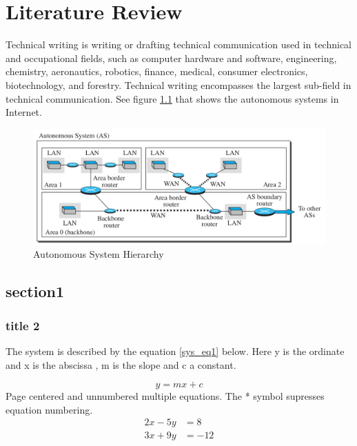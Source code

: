 \chapter{Literature Review}
Technical writing is writing or drafting technical communication used in
technical and occupational fields\cite{india}, such as computer hardware and
software\cite{rpi}, engineering, chemistry, aeronautics, robotics,
finance\cite{japan}, medical, consumer electronics, biotechnology, and
forestry. Technical writing encompasses the largest sub-field in technical
communication. See figure \ref{net2} that shows the autonomous systems in
Internet.

\begin{figure}[h!]
	\centering
	\includegraphics[width=0.9\linewidth]{ospf}
	\caption{Autonomous System Hierarchy}
	\label{net2}
\end{figure}

\section{section1}
\lipsum[2] %

\subsection{title 2}
\lipsum[3] %

\noindent The system is described by the equation \ref{sys_eq1} below. Here y is the ordinate and x is the abscissa , m is the slope and c a constant.

\begin{equation} \label{sys_eq1}
	y = mx + c
\end{equation}
\noindent Page centered and unnumbered multiple equations. The * symbol supresses equation numbering.
\begin{align*}
	2x - 5y & =  8   \\
	3x + 9y & =  -12
\end{align*}

